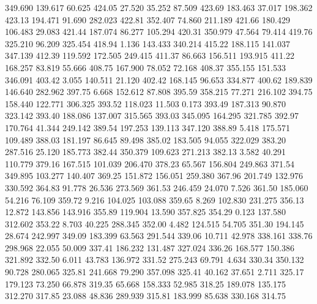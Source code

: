  349.690  139.617   60.625       424.05
  27.520   35.252   87.509       423.69
 183.463   37.017  198.362       423.13
 194.471   91.690  282.023       422.81
 352.407   74.860  211.189       421.66
 180.429  106.483   29.083       421.44
 187.074   86.277  105.294       420.31
 350.979   47.564   79.414       419.76
 325.210   96.209  325.454       418.94
   1.136  143.433  340.214       415.22
 188.115  141.037  347.139       412.39
 119.592  172.505  249.415       411.37
  86.663  156.511  193.915       411.22
 168.257   83.819   55.666       408.75
 167.900   78.052   72.168       408.37
 355.155  151.533  346.091       403.42
   3.055  140.511   21.120       402.42
 168.145   96.653  334.877       400.62
 189.839  146.640  282.962       397.75
   6.668  152.612   87.808       395.59
 358.215   77.271  216.102       394.75
 158.440  122.771  306.325       393.52
 118.023   11.503    0.173       393.49
 187.313   90.870  323.142       393.40
 188.086  137.007  315.565       393.03
 345.095  164.295  321.785       392.97
 170.764   41.344  249.142       389.54
 197.253  139.113  347.120       388.89
   5.418  175.571  109.489       388.03
 181.197   86.645   89.498       385.02
 183.505   94.055  322.029       383.20
 287.516   25.120  185.773       382.44
 350.379  109.623  271.213       382.13
   3.582   40.291  110.779       379.16
 167.515  101.039  206.470       378.23
  65.567  156.804  249.863       371.54
 349.895  103.277  140.407       369.25
 151.872  156.051  259.380       367.96
 201.749  132.976  330.592       364.83
  91.778   26.536  273.569       361.53
 246.459   24.070    7.526       361.50
 185.060   54.216   76.109       359.72
   9.216  104.025  103.088       359.65
   8.269  102.830  231.275       356.13
  12.872  143.856  143.916       355.89
 119.904   13.590  357.825       354.29
   0.123  137.580  312.602       353.22
   8.703   40.225  288.345       352.00
   4.482  124.515   54.705       351.30
 194.145   28.674  242.997       349.09
 183.399   63.563  291.544       339.06
  10.711   42.978  338.161       338.76
 298.968   22.055   50.009       337.41
 186.232  131.487  327.024       336.26
 168.577  150.386  321.892       332.50
   6.011   43.783  136.972       331.52
 275.243   69.791    4.634       330.34
 350.132   90.728  280.065       325.81
 241.668   79.290  357.098       325.41
  40.162   37.651    2.711       325.17
 179.123   73.250   66.878       319.35
  65.668  158.333   52.985       318.25
 189.078  135.175  312.270       317.85
  23.088   48.836  289.939       315.81
 183.999   85.638  330.168       314.75
